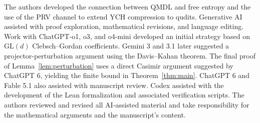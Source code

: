 \documentclass[a4paper,onecolumn,11pt]{quantumarticle}
\begin{document}
The authors developed the connection between QMDL and free entropy
and the use of the PRV channel to extend YCH compression to qudits.
Generative AI assisted with proof exploration, mathematical revisions,
and language editing. Work with ChatGPT-o1, o3, and o4-mini developed
an initial strategy based on $\mathrm{GL}(d)$ Clebsch--Gordan
coefficients. Gemini 3 and 3.1 later suggested a projector-perturbation
argument using the Davis--Kahan theorem. The final proof of
Lemma~\ref{lem:perturbation} uses a direct Casimir argument suggested
by ChatGPT 6, yielding the finite bound in Theorem~\ref{thm:main}.
ChatGPT 6 and Fable 5.1 also assisted with manuscript review.
Codex assisted with the development of the Lean formalization and
associated verification scripts.
The authors reviewed and revised all AI-assisted material and take
responsibility for the mathematical arguments and the manuscript's content.


\appendix
\end{document}
